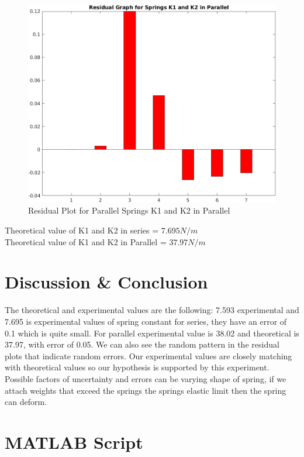 \begin{center}
\begin{figure}[h!]
    \centering
    \includegraphics[width=\textwidth]{figures/K1_K2_Parallel_R.png}
    \caption{Residual Plot for Parallel Springs K1 and K2 in Parallel}
    \label{fig:k1_Se_R}
\end{figure}
\end{center}
Theoretical value of K1 and K2 in series = $ 7.695 N/m$ \\
Theoretical value of K1 and K2 in Parallel = $ 37.97 N/m$ \\

\section{Discussion \& Conclusion}
The theoretical and experimental values are the following: 7.593 experimental and 7.695 is experimental values of spring constant for series, they have an error of 0.1 which is quite small. For parallel experimental value is 38.02 and theoretical is 37.97, with error of 0.05. We can also see the random pattern in the residual plots that indicate random errors. Our experimental values are closely matching with theoretical values so our hypothesis is supported by this experiment. \\
 Possible factors of uncertainty and errors can be varying shape of spring, if we attach weights that exceed the springs the springs elastic limit then the spring can deform.
 
 



\section{MATLAB Script}




